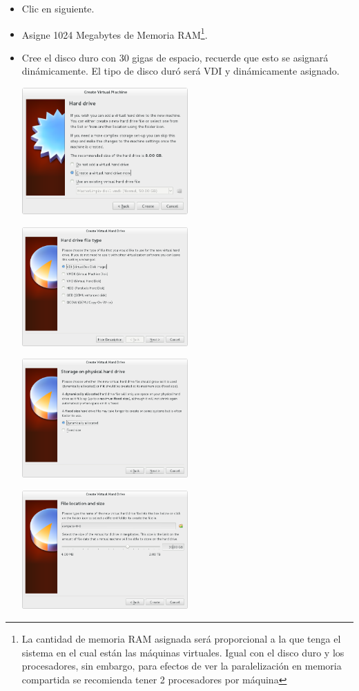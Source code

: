 \begin{enumerate}
\begin{itemize}
	\item Clic en siguiente.

	\item Asigne 1024 Megabytes de Memoria RAM\footnote{La cantidad de memoria RAM asignada será proporcional a la que tenga el sistema en el cual están las máquinas virtuales. Igual con el disco duro y los procesadores, sin embargo, para efectos de ver la paralelización en memoria compartida se recomienda tener 2 procesadores por máquina}.

	\item Cree el disco duro con 30 gigas de espacio, recuerde que esto se asignará dinámicamente. El tipo de disco duró será VDI y dinámicamente asignado.



	\includegraphics[width=0.5\textwidth]{aux/nodohd}

	
	\includegraphics[width=0.5\textwidth]{aux/nododvi}


	\includegraphics[width=0.5\textwidth]{aux/hddinamico}


	\includegraphics[width=0.5\textwidth]{aux/nodohdsize}
	


\end{itemize}
\end{enumerate}
